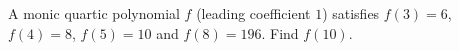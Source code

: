 A monic quartic polynomial $f$ (leading coefficient $1$) satisfies $f(3)=6$, $f(4)=8$, $f(5)=10$ and $f(8)=196$. Find $f(10)$.
